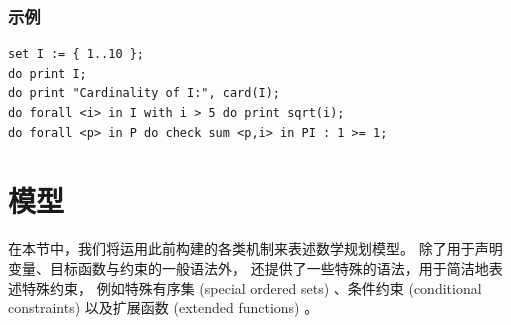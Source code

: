 \subsubsection{示例}
{\small
\begin{verbatim}
set I := { 1..10 };
do print I;
do print "Cardinality of I:", card(I);
do forall <i> in I with i > 5 do print sqrt(i);
do forall <p> in P do check sum <p,i> in PI : 1 >= 1;
\end{verbatim}
}



\section{模型}
在本节中，我们将运用此前构建的各类机制来表述数学规划模型。  
除了用于声明变量、目标函数与约束的一般语法外，  
还提供了一些特殊的语法，用于简洁地表述特殊约束，  
例如特殊有序集 (special ordered sets) 、条件约束 
(conditional constraints) 以及扩展函数 (extended functions) 。

